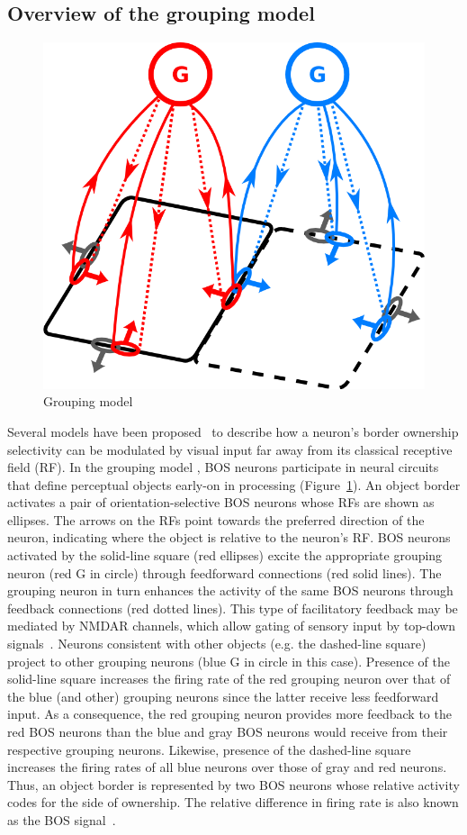 \documentclass[11pt]{article}
\begin{document}
\subsection{Overview of the grouping model}
\begin{figure}
  \vspace{-60pt}
  \centering 
  \includegraphics[width=.3\textwidth]{figs/groupingcircuit}
  \caption{Grouping model} 
  \vspace{-15pt}
  \label{fig:GroupingModel}
\end{figure}
Several models have been proposed~\citep{Zhaoping05,
  Sakai_Nishimura06,Craft_etal07, Layton_etal12} to
describe how a neuron's border ownership selectivity can be modulated
by visual input far away from its classical receptive field (RF). In the grouping model
\citep{Craft_etal07}, BOS neurons
participate in neural circuits that define perceptual objects early-on
in processing (Figure~\ref{fig:GroupingModel}). An object border
activates a pair of orientation-selective BOS neurons whose RFs are
shown as ellipses. The arrows on the RFs point towards the preferred
direction of the neuron, indicating where the object is relative to
the neuron's RF. BOS neurons activated by the solid-line square (red
ellipses) excite the appropriate grouping neuron (red G in circle)
through feedforward connections (red solid lines). The grouping neuron
in turn enhances the activity of the same BOS neurons through feedback
connections (red dotted lines). This type of facilitatory feedback may
be mediated by NMDAR channels, which allow gating of sensory input by
top-down signals~\citep{Palmer_etal14}. Neurons consistent with other
objects (e.g. the dashed-line square) project to other grouping
neurons (blue G in circle in this case). Presence of the solid-line
square increases the firing rate of the red grouping neuron over that
of the blue (and other) grouping neurons since the latter receive less
feedforward input. As a consequence, the red grouping neuron provides
more feedback to the red BOS neurons than the blue and gray BOS
neurons would receive from their respective grouping
neurons. Likewise, presence of the dashed-line square increases the
firing rates of all blue neurons over those of gray and red
neurons. Thus, an object border is represented by two BOS neurons
whose relative activity codes for the side of ownership. The relative
difference in firing rate is also known as the BOS
signal~\citep{Zhou_etal00}.
\end{document}
